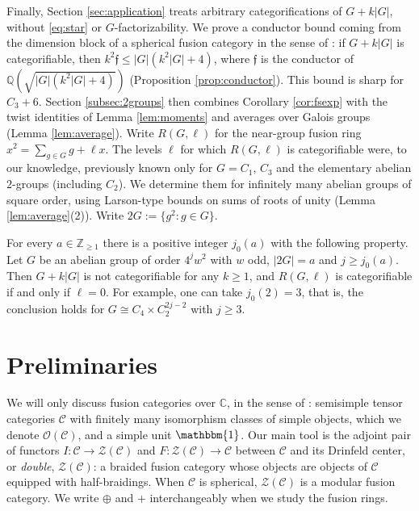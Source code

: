 \documentclass[10pt]{article}
\theoremstyle{plain}
\theoremstyle{definition}
\theoremstyle{plain}
\newenvironment{customthm}[1]{\renewcommand\theinnercustomthm{#1}\innercustomthm}{\endinnercustomthm}
\begin{document}
\par Finally, Section \ref{sec:application} treats arbitrary categorifications of $G+k|G|$, without \eqref{eq:star} or $G$-factorizability. We prove a conductor bound coming from the dimension block of a spherical fusion category in the sense of \cite{schopieray2026dimensionblocksphericalfusion}: if $G+k|G|$ is categorifiable, then $k^2\mathfrak{f}\leq|G|(k^2|G|+4)$, where $\mathfrak{f}$ is the conductor of $\mathbb{Q}(\sqrt{|G|(k^2|G|+4)})$ (Proposition \ref{prop:conductor}). This bound is sharp for $C_3+6$. Section \ref{subsec:2groups} then combines Corollary \ref{cor:fsexp} with the twist identities of Lemma \ref{lem:moments} and averages over Galois groups (Lemma \ref{lem:average}). Write $R(G,\ell)$ for the near-group fusion ring $x^2=\sum_{g\in G}g+\ell x$. The levels $\ell$ for which $R(G,\ell)$ is categorifiable were, to our knowledge, previously known only for $G=C_1$, $C_3$ and the elementary abelian $2$-groups (including $C_2$). We determine them for infinitely many abelian groups of square order, using Larson-type bounds on sums of roots of unity (Lemma \ref{lem:average}(2)). Write $2G:=\{g^2:g\in G\}$.

\begin{customthm}{\ref{thm:2groups}}
For every $a\in\mathbb{Z}_{\geq1}$ there is a positive integer $j_0(a)$ with the following property. Let $G$ be an abelian group of order $4^jw^2$ with $w$ odd, $|2G|=a$ and $j\geq j_0(a)$. Then $G+k|G|$ is not categorifiable for any $k\geq1$, and $R(G,\ell)$ is categorifiable if and only if $\ell=0$. For example, one can take $j_0(2)=3$, that is, the conclusion holds for $G\cong C_4\times C_2^{2j-2}$ with $j\geq3$.
\end{customthm}


\section{Preliminaries}\label{sec:prelim}


\par We will only discuss fusion categories over $\mathbb{C}$, in the sense of \cite{MR2183279}: semisimple tensor categories $\mathcal{C}$ with finitely many isomorphism classes of simple objects, which we denote $\mathcal{O}(\mathcal{C})$, and a simple unit $\mathbbm{1}$. Our main tool is the adjoint pair of functors $I:\mathcal{C}\to\mathcal{Z}(\mathcal{C})$ and $F:\mathcal{Z}(\mathcal{C})\to\mathcal{C}$ between $\mathcal{C}$ and its Drinfeld center, or \emph{double}, $\mathcal{Z}(\mathcal{C})$: a braided fusion category whose objects are objects of $\mathcal{C}$ equipped with half-braidings. When $\mathcal{C}$ is spherical, $\mathcal{Z}(\mathcal{C})$ is a modular fusion category. We write $\oplus$ and $+$ interchangeably when we study the fusion rings.
\end{document}
